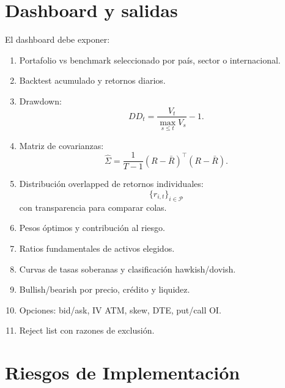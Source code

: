 \documentclass[11pt,letterpaper]{article}
\newcommand{\1}{\mathbf{1}}
\begin{document}
\newpage
\section{Dashboard y salidas}

El dashboard debe exponer:

\begin{enumerate}
    \item Portafolio vs benchmark seleccionado por país, sector o internacional.
    \item Backtest acumulado y retornos diarios.
    \item Drawdown:
    \[
        DD_t=\frac{V_t}{\max_{s\le t}V_s}-1.
    \]
    \item Matriz de covarianzas:
    \[
        \hat\Sigma = \frac{1}{T-1}(R-\bar R)^\top(R-\bar R).
    \]
    \item Distribución overlapped de retornos individuales:
    \[
        \{r_{i,t}\}_{i\in\mathcal{P}}
    \]
    con transparencia para comparar colas.
    \item Pesos óptimos y contribución al riesgo.
    \item Ratios fundamentales de activos elegidos.
    \item Curvas de tasas soberanas y clasificación hawkish/dovish.
    \item Bullish/bearish por precio, crédito y liquidez.
    \item Opciones: bid/ask, IV ATM, skew, DTE, put/call OI.
    \item Reject list con razones de exclusión.
\end{enumerate}

\newpage
\section{Riesgos de Implementación}
\end{document}
